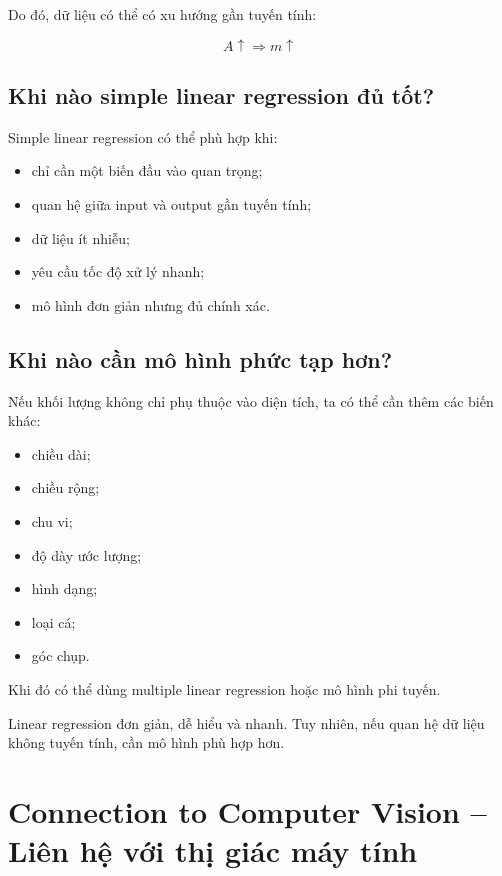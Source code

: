 Do đó, dữ liệu có thể có xu hướng gần tuyến tính:

\[
    A \uparrow
    \Rightarrow
    m \uparrow
\]

\subsection{Khi nào simple linear regression đủ tốt?}

Simple linear regression có thể phù hợp khi:

\begin{itemize}
    \item chỉ cần một biến đầu vào quan trọng;
    \item quan hệ giữa input và output gần tuyến tính;
    \item dữ liệu ít nhiễu;
    \item yêu cầu tốc độ xử lý nhanh;
    \item mô hình đơn giản nhưng đủ chính xác.
\end{itemize}

\subsection{Khi nào cần mô hình phức tạp hơn?}

Nếu khối lượng không chỉ phụ thuộc vào diện tích, ta có thể cần thêm các biến khác:

\begin{itemize}
    \item chiều dài;
    \item chiều rộng;
    \item chu vi;
    \item độ dày ước lượng;
    \item hình dạng;
    \item loại cá;
    \item góc chụp.
\end{itemize}

Khi đó có thể dùng multiple linear regression hoặc mô hình phi tuyến.

\begin{luuy}
Linear regression đơn giản, dễ hiểu và nhanh. Tuy nhiên, nếu quan hệ dữ liệu không tuyến tính, cần mô hình phù hợp hơn.
\end{luuy}

\section{Connection to Computer Vision -- Liên hệ với thị giác máy tính}

